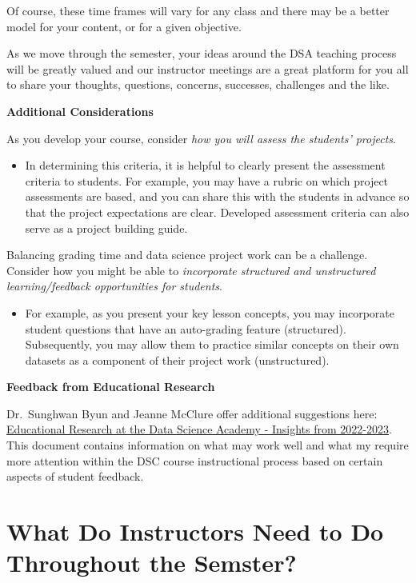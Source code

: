 \documentclass[
]{book}
\providecommand{\tightlist}{%
  \setlength{\itemsep}{0pt}\setlength{\parskip}{0pt}}
\begin{document}
Of course, these time frames will vary for any class and there may be a better model for your content, or for a given objective.

As we move through the semester, your ideas around the DSA teaching process will be greatly valued and our instructor meetings are a great platform for you all to share your thoughts, questions, concerns, successes, challenges and the like.

\textbf{Additional Considerations}

As you develop your course, consider \emph{how you will assess the students' projects}.

\begin{itemize}
\tightlist
\item
  In determining this criteria, it is helpful to clearly present the assessment criteria to students. For example, you may have a rubric on which project assessments are based, and you can share this with the students in advance so that the project expectations are clear. Developed assessment criteria can also serve as a project building guide.
\end{itemize}

Balancing grading time and data science project work can be a challenge. Consider how you might be able to \emph{incorporate structured and unstructured learning/feedback opportunities for students}.

\begin{itemize}
\tightlist
\item
  For example, as you present your key lesson concepts, you may incorporate student questions that have an auto-grading feature (structured). Subsequently, you may allow them to practice similar concepts on their own datasets as a component of their project work (unstructured).
\end{itemize}

\textbf{Feedback from Educational Research}

Dr.~Sunghwan Byun and Jeanne McClure offer additional suggestions here: \href{https://docs.google.com/document/d/1jRILSc0DsFm2moet9Ep8bF1suEOfHfnLzfJ2t4tIfjA/edit?usp=sharing}{Educational Research at the Data Science Academy - Insights from 2022-2023}. This document contains information on what may work well and what my require more attention within the DSC course instructional process based on certain aspects of student feedback.

\hypertarget{what-do-instructors-need-to-do-throughout-the-semster}{%
\chapter{What Do Instructors Need to Do Throughout the Semster?}\label{what-do-instructors-need-to-do-throughout-the-semster}}
\end{document}

